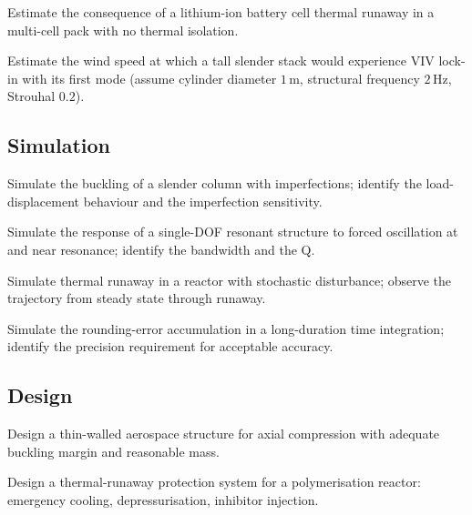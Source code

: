 \begin{exercise}
Estimate the consequence of a lithium-ion battery cell thermal runaway in a multi-cell pack with no thermal isolation.
\end{exercise}

\begin{exercise}
Estimate the wind speed at which a tall slender stack would experience VIV lock-in with its first mode (assume cylinder diameter $1\,\text{m}$, structural frequency $2\,\text{Hz}$, Strouhal $0.2$).
\end{exercise}

\subsection*{Simulation}

\begin{exercise}
Simulate the buckling of a slender column with imperfections; identify the load-displacement behaviour and the imperfection sensitivity.
\end{exercise}

\begin{exercise}
Simulate the response of a single-DOF resonant structure to forced oscillation at and near resonance; identify the bandwidth and the Q.
\end{exercise}

\begin{exercise}
Simulate thermal runaway in a reactor with stochastic disturbance; observe the trajectory from steady state through runaway.
\end{exercise}

\begin{exercise}
Simulate the rounding-error accumulation in a long-duration time integration; identify the precision requirement for acceptable accuracy.
\end{exercise}

\subsection*{Design}

\begin{exercise}
Design a thin-walled aerospace structure for axial compression with adequate buckling margin and reasonable mass.
\end{exercise}

\begin{exercise}
Design a thermal-runaway protection system for a polymerisation reactor: emergency cooling, depressurisation, inhibitor injection.
\end{exercise}

